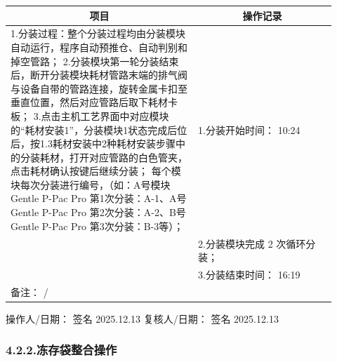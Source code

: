\documentclass[UTF8,10pt,a4paper,fontset=fandol]{ctexart}
\newcommand{\fieldvalue}[1]{#1}
\newcommand{\handwritten}[1]{#1}
\begin{document}
\begin{tabular}{|p{0.53\linewidth}|p{0.39\linewidth}|}
\hline
\multicolumn{1}{|c|}{项目} & \multicolumn{1}{c|}{操作记录}\\
\hline
1.分装过程：整个分装过程均由分装模块自动运行，程序自动预推仓、自动判别和掉空管路；\newline
2.分装模块第一轮分装结束后，断开分装模块耗材管路末端的排气阀与设备自带的管路连接，旋转金属卡扣至垂直位置，然后对应管路后取下耗材卡板；\newline
3.点击主机工艺界面中对应模块的“耗材安装1”，分装模块1状态完成后位后，按1.3耗材安装中2种耗材安装步骤中的分装耗材，打开对应管路的白色管夹，点击耗材确认按键后继续分装；\newline
每个模块每次分装进行编号，（如：A号模块 Gentle P-Pac Pro 第1次分装：A-1、A号 Gentle P-Pac Pro 第2次分装：A-2、B号 Gentle P-Pac Pro 第3次分装：B-3等）； &
1.分装开始时间：
\fieldvalue{\handwritten{10:24}}\\
&
2.分装模块完成
\fieldvalue{\handwritten{2}} 次循环分装；\\
&
3.分装结束时间：
\fieldvalue{\handwritten{16:19}}\\
\hline
\multicolumn{2}{|l|}{备注：
\fieldvalue{\handwritten{/}}}\\
\hline
\end{tabular}

\noindent 操作人/日期：
\fieldvalue{\handwritten{签名}} \quad
\fieldvalue{\handwritten{2025.12.13}}
\hfill
复核人/日期：
\fieldvalue{\handwritten{签名}} \quad
\fieldvalue{\handwritten{2025.12.13}}

\subsubsection*{4.2.2.\quad 冻存袋整合操作}
\end{document}
